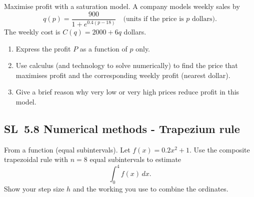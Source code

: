 \documentclass[11pt]{article}
\def\textbf#1{#1}%
\newcommand{\tocsubsection}[1]{\subsection{#1}}
\newcounter{question}
\begin{document}
\begin{question}
\textbf{Maximise profit with a saturation model.}
A company models weekly sales by
\[
q(p)=\frac{900}{1+e^{0.4(p-18)}}\quad\text{(units if the price is $p$ dollars).}
\]
The weekly cost is $C(q)=2000+6q$ dollars.
\begin{enumerate}
  \item Express the profit $P$ as a function of $p$ only.
  \item Use calculus (and technology to solve numerically) to find the price that maximises profit and the corresponding weekly profit (nearest dollar).
  \item Give a brief reason why very low or very high prices reduce profit in this model.
\end{enumerate}

\begin{center}
\end{center}
\end{question}

\tocsubsection{SL 5.8 \; Numerical methods - Trapezium rule}


\begin{question}
\textbf{From a function (equal subintervals).}
Let \(f(x)=0.2x^{2}+1\). Use the composite trapezoidal rule with \(n=8\) equal subintervals to estimate
\[
\int_{0}^{4} f(x)\,dx .
\]
Show your step size \(h\) and the working you use to combine the ordinates.

\begin{center}
\end{center}
\end{question}
\end{document}
